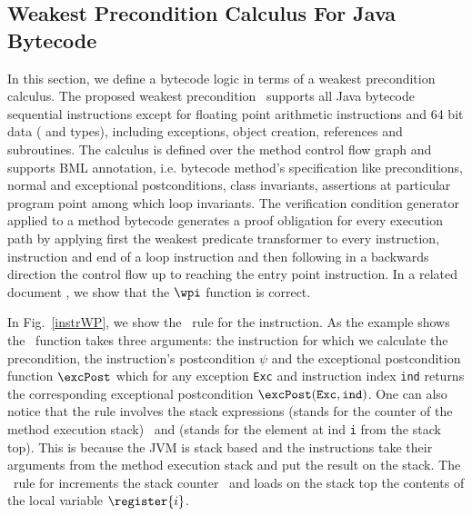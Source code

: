 \subsection{Weakest Precondition Calculus For Java
Bytecode}\label{wpbc} In this section, we define a bytecode logic in
terms of a weakest precondition calculus. The proposed weakest
precondition \wpi \ supports all Java bytecode sequential instructions
except for floating point arithmetic instructions and 64 bit data
( and  types), including exceptions, object
creation, references and subroutines. The calculus is defined over the
method control flow graph and supports BML annotation, i.e. bytecode
method's specification like preconditions, normal and exceptional
postconditions, class invariants, assertions at particular program
point among which loop invariants. The verification condition
generator applied to a method bytecode generates a proof obligation
for every execution path by applying first the weakest predicate
transformer to every  instruction, 
instruction and end of a loop instruction and then following in a
backwards direction the control flow up to reaching the entry point
instruction. In a related document \cite{JBL05MP}, we show that the
$\wpi$ function is correct.

 In Fig.~\ref{instrWP}, we show the \wpi \ rule for the  instruction.
 As the example shows the \wpi \ function takes three arguments:
the instruction for which we calculate the precondition, 
the instruction's postcondition $\psi$ and the exceptional postcondition function $\excPost$ which for any exception \texttt{Exc} and 
instruction index \texttt{ind} returns the
corresponding exceptional postcondition $\excPost(\texttt{Exc}, \tt{ind})$. One can also notice that the rule involves the stack expressions \counter 
(stands for the counter of the method execution stack) \ and  (stands for the element at ind \texttt{i} from the stack top).
 This is because the JVM is stack based and the instructions take their arguments from the method execution stack and 
 put the result on the stack.
 The \wpi \ rule for   increments the stack counter \counter \ and loads on the stack top the contents
 of the local variable $\register{i}$. 




